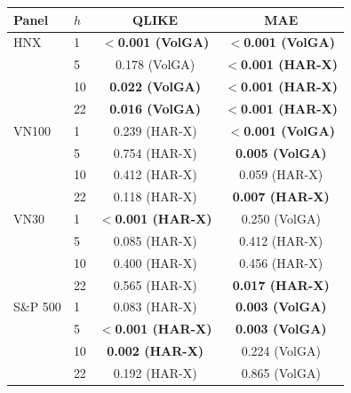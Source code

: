 \begin{tabular}{ll cc}
\toprule
Panel & $h$ & QLIKE & MAE \\
\midrule
HNX & 1 & \textbf{$<$0.001 (VolGA)} & \textbf{$<$0.001 (VolGA)} \\
 & 5 & 0.178 (VolGA) & \textbf{$<$0.001 (HAR-X)} \\
 & 10 & \textbf{0.022 (VolGA)} & \textbf{$<$0.001 (HAR-X)} \\
 & 22 & \textbf{0.016 (VolGA)} & \textbf{$<$0.001 (HAR-X)} \\
\midrule
VN100 & 1 & 0.239 (HAR-X) & \textbf{$<$0.001 (VolGA)} \\
 & 5 & 0.754 (HAR-X) & \textbf{0.005 (VolGA)} \\
 & 10 & 0.412 (HAR-X) & 0.059 (HAR-X) \\
 & 22 & 0.118 (HAR-X) & \textbf{0.007 (HAR-X)} \\
\midrule
VN30 & 1 & \textbf{$<$0.001 (HAR-X)} & 0.250 (VolGA) \\
 & 5 & 0.085 (HAR-X) & 0.412 (HAR-X) \\
 & 10 & 0.400 (HAR-X) & 0.456 (HAR-X) \\
 & 22 & 0.565 (HAR-X) & \textbf{0.017 (HAR-X)} \\
\midrule
S\&P 500 & 1 & 0.083 (HAR-X) & \textbf{0.003 (VolGA)} \\
 & 5 & \textbf{$<$0.001 (HAR-X)} & \textbf{0.003 (VolGA)} \\
 & 10 & \textbf{0.002 (HAR-X)} & 0.224 (VolGA) \\
 & 22 & 0.192 (HAR-X) & 0.865 (VolGA) \\
\bottomrule
\end{tabular}
